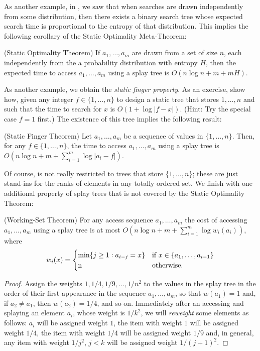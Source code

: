 {As another example, in , we saw that when searches are
drawn independently from some distribution, then there exists a binary
search tree whose expected search time is proportional to the entropy of
that distribution.  This implies the following corollary of the Static
Optimality Meta-Theorem:

\begin{cor}(Static Optimality Theorem)
If $a_1,\ldots,a_m$ are drawn from a set of size $n$, each independently
from the a probability distribution with entropy $H$, then the expected
time to access $a_1,\ldots,a_m$ using a splay tree is $O(n\log n +
m + mH)$.
\end{cor}

As another example, we obtain the \emph{static finger property}. As an
exercise, show how, given any integer $f\in\{1,\ldots,n\}$ to design a
static tree that stores $1,\ldots,n$ and such that the time to search
for $x$ is $O(1+\log|f-x|)$. (Hint: Try the special case $f=1$ first.)
The existence of this tree implies the following result:

\begin{cor}(Static Finger Theorem)
Let $a_1,\ldots,a_m$ be a sequence of values in $\{1,\ldots,n\}$.  Then,
for any $f\in\{1,\ldots,n\}$, the time to access $a_1,\ldots,a_m$ using
a splay tree is $O(n\log n + m + \sum_{i=1}^m \log|a_i-f|)$.
\end{cor}

Of course,  is not really restricted to trees that
store $\{1,\ldots,n\}$; these are just stand-ins for the ranks of elements
in any totally ordered set.  We finish with one additional property of
splay trees that is not covered by the Static Optimality Theorem:

\begin{thm}(Working-Set Theorem)
For any access sequence $a_1,\ldots,a_m$
the cost of accessing $a_1,\ldots,a_m$ using a splay tree is at most
$O(n\log n + m + \sum_{i=1}^m\log w_i(a_i))$, where
\[
   w_i(x) = \begin{cases}
        \min\{j\ge 1 : a_{i-j}=x\} & \text{if $x\in\{a_1,\ldots,a_{i-1}\}$} \\
        $n$ & \text{otherwise.}
       \end{cases}
\]
\end{thm}

\begin{proof}
Assign the weights $1, 1/4, 1/9, \ldots, 1/n^2$ to the values in the splay tree in the order of their first appearance in the sequence $a_1,\ldots,a_m$, so that $w(a_1)=1$ and, if $a_2\neq a_1$, then $w(a_2)=1/4$, and so on.  Immediately after an accessing and splaying an element $a_i$, whose weight is $1/k^2$, we will \emph{reweight} some elements as follows: $a_i$ will be assigned weight $1$, the item with weight $1$ will be assigned weight $1/4$, the item with weight $1/4$ will be assigned weight $1/9$ and, in general, any item with weight $1/j^2$, $j<k$ will be assigned weight $1/(j+1)^2$.


\end{proof}}
